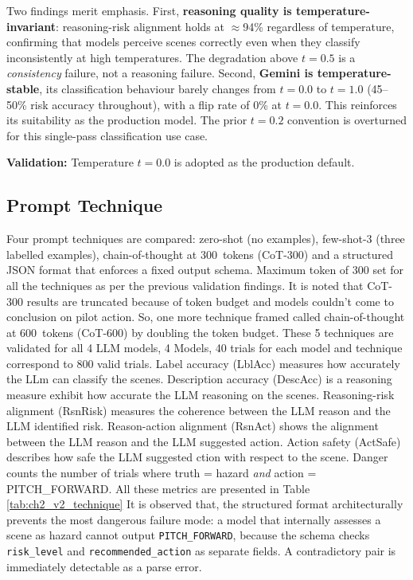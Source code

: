 Two findings merit emphasis. 
First, \textbf{reasoning quality is temperature-invariant}: reasoning-risk alignment holds at $\approx$94\% regardless of temperature, confirming that models perceive scenes correctly
even when they classify inconsistently at high temperatures. 
The degradation above $t=0.5$ is a \emph{consistency} failure, not a reasoning failure.
Second, \textbf{Gemini is temperature-stable}, its classification behaviour barely changes from $t=0.0$ to $t=1.0$ (45--50\% risk accuracy throughout), with a flip rate of 0\% at $t=0.0$. 
This reinforces its suitability as the production model.
The prior $t=0.2$ convention \cite{yao2022react} is overturned for this single-pass classification use case.

\textbf{Validation:} Temperature $t=0.0$ is adopted as the production default.


\subsection{Prompt Technique}
\label{sec:ch2_v2}

Four prompt techniques are compared: zero-shot (no examples), few-shot-3 (three labelled examples), chain-of-thought at 300~tokens (CoT-300) and a structured JSON format that enforces a fixed output schema.
Maximum token of 300 set for all the techniques as per the previous validation findings.
It is noted that CoT-300 results are truncated because of token budget and models couldn't come to conclusion on pilot action.
So, one more technique framed called chain-of-thought at 600~tokens (CoT-600) by doubling the token budget.
These 5 techniques are validated for all 4 LLM models, 4 Models, 40 trials for each model and technique correspond to 800 valid trials. 
Label accuracy (LblAcc) measures how accurately the LLm can classify the scenes.
Description accuracy (DescAcc) is a reasoning measure exhibit how accurate the LLM reasoning on the scenes.
Reasoning-risk alignment (RsnRisk) measures the coherence between the LLM reason and the LLM identified risk.
Reason-action alignment (RsnAct) shows the alignment between the LLM reason and the LLM suggested action.
Action safety (ActSafe) describes how safe the LLM suggested ction with respect to the scene.
Danger counts the number of trials where truth = hazard \emph{and} action = PITCH\_FORWARD. 
All these metrics are presented in Table \ref{tab:ch2_v2_technique}
It is observed that, the structured format architecturally prevents the most dangerous failure mode: a model that internally assesses a scene as hazard cannot output \texttt{PITCH\_FORWARD}, because the schema checks \texttt{risk\_level} and \texttt{recommended\_action} as separate fields. 
A contradictory pair is immediately detectable as a parse error.

